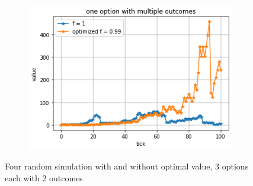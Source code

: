 \documentclass{article}
\begin{document}
\begin{figure}[!h]
\begin{subfigure}{0.525\textwidth}
		\end{subfigure}
		\begin{subfigure}{0.525\textwidth}
			\includegraphics[width=0.9\linewidth]{multi4}
		\end{subfigure}
		\caption{Four random simulation with and without optimal value, 3 options each with 2 outcomes}
		\label{Fig:multi1}
	\end{figure}	
\end{document}
